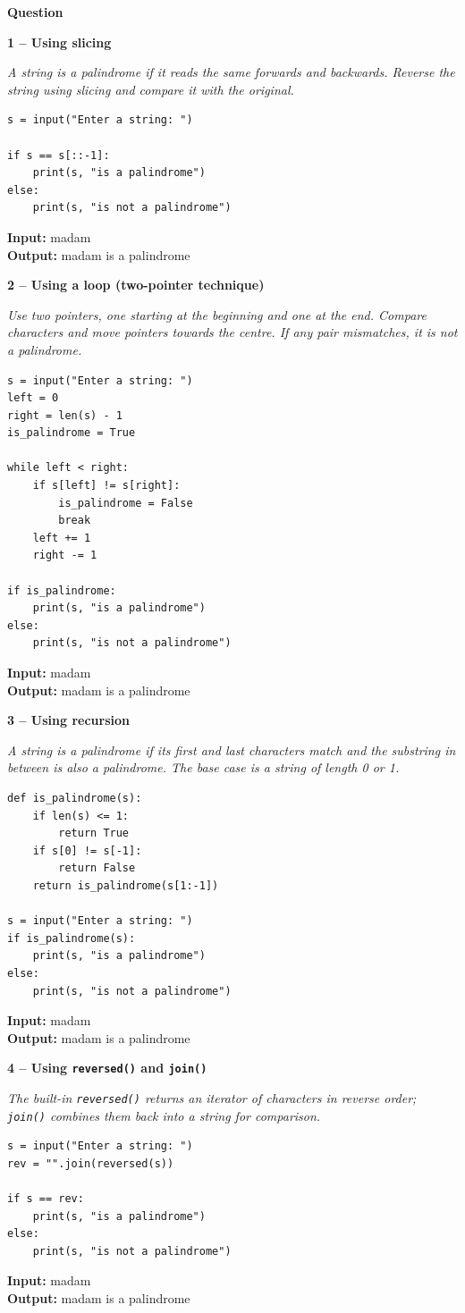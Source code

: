 \documentclass[12pt]{article}
\newenvironment{qbox}[1]{\par\bigskip\noindent\textbf{#1}\par}{\par\medskip}
\newcommand{\1}{Question}
\newcommand{\method}[1]{\par\medskip\noindent\textbf{#1}\par}
\newcommand{\logicbox}[1]{\par\smallskip\noindent\textit{#1}\par}
\newcommand{\inout}[2]{\par\smallskip\noindent\textbf{Input:} #1\\\textbf{Output:} #2\par}
\begin{document}
\begin{qbox}{\1}

\method{1 -- Using slicing}
\logicbox{A string is a palindrome if it reads the same forwards and backwards. Reverse the string using slicing and compare it with the original.}
\begin{lstlisting}
s = input("Enter a string: ")

if s == s[::-1]:
    print(s, "is a palindrome")
else:
    print(s, "is not a palindrome")
\end{lstlisting}
\inout{madam}{madam is a palindrome}

\method{2 -- Using a loop (two-pointer technique)}
\logicbox{Use two pointers, one starting at the beginning and one at the end. Compare characters and move pointers towards the centre. If any pair mismatches, it is not a palindrome.}
\begin{lstlisting}
s = input("Enter a string: ")
left = 0
right = len(s) - 1
is_palindrome = True

while left < right:
    if s[left] != s[right]:
        is_palindrome = False
        break
    left += 1
    right -= 1

if is_palindrome:
    print(s, "is a palindrome")
else:
    print(s, "is not a palindrome")
\end{lstlisting}
\inout{madam}{madam is a palindrome}

\method{3 -- Using recursion}
\logicbox{A string is a palindrome if its first and last characters match and the substring in between is also a palindrome. The base case is a string of length 0 or 1.}
\begin{lstlisting}
def is_palindrome(s):
    if len(s) <= 1:
        return True
    if s[0] != s[-1]:
        return False
    return is_palindrome(s[1:-1])

s = input("Enter a string: ")
if is_palindrome(s):
    print(s, "is a palindrome")
else:
    print(s, "is not a palindrome")
\end{lstlisting}
\inout{madam}{madam is a palindrome}

\method{4 -- Using \texttt{reversed()} and \texttt{join()}}
\logicbox{The built-in \texttt{reversed()} returns an iterator of characters in reverse order; \texttt{join()} combines them back into a string for comparison.}
\begin{lstlisting}
s = input("Enter a string: ")
rev = "".join(reversed(s))

if s == rev:
    print(s, "is a palindrome")
else:
    print(s, "is not a palindrome")
\end{lstlisting}
\inout{madam}{madam is a palindrome}
\end{qbox}
\end{document}
